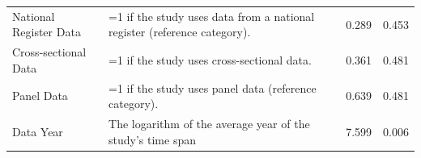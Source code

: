 \begin{singlespace}
\begin{scriptsize}
\begin{longtable}{
@{\hskip\tabcolsep\extracolsep\fill}
l
p{0.55\hsize}
cc
@{}
}
 National Register Data &                                                                                 =1 if the study uses data from a national register (reference category). &    0.289 &  0.453 \\
   Cross-sectional Data &                                                                                                               =1 if the study uses cross-sectional data. &    0.361 &  0.481 \\
             Panel Data &                                                                                                    =1 if the study uses panel data (reference category). &    0.639 &  0.481 \\
              Data Year &                                                                                               The logarithm of the average year of the study's time span &    7.599 & 0.006 \\
    \midrule 
    

\end{longtable}
\end{scriptsize}
\end{singlespace}
